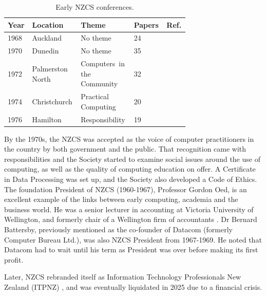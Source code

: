 \documentclass{IEEEcsmag}
\begin{document}
\begin{table}[h]
\begin{center}
\begin{tabular}{|p{0.07\linewidth}|p{0.20\linewidth}|p{0.26\linewidth}|p{0.12\linewidth}|p{0.05\linewidth}<{\raggedright\arraybackslash}|} 
 \hline
 Year & Location & Theme  & Papers & Ref.\\ 
\hline
1968 & Auckland & No theme & 24 & \cite{NZCS-1}\\\hline
1970 & Dunedin& No theme &  35 & \cite{NZCS-2}\\\hline
1972 & Palmerston North & Computers~in the Community &  32 & \cite{NZCS-3}\\\hline
1974 & Christchurch & Practical Computing &  20 & \cite{NZCS-4}\\\hline
1976 & Hamilton & Responsibility &  19 & \cite{NZCS-5}\\\hline
\end{tabular}
\vspace{1ex}
\caption{\label{NZCSconf}Early NZCS conferences.}
\end{center}
\end{table}
By the 1970s, the NZCS was accepted as the voice of computer practitioners in the country by both government and the public.  That recognition came with responsibilities and the Society started to examine social issues around the use of computing, as well as the quality of computing education on offer.  A Certificate in Data Processing was set up, and the Society also developed a Code of Ethics.
The foundation President of NZCS (1960-1967), Professor Gordon Oed,  is an excellent example of the links between early computing, academia and the business world. He was a senior lecturer in accounting at Victoria University of Wellington, and formerly chair of a Wellington firm of accountants \cite{Toland-2022}. Dr Bernard Battersby, previously mentioned as the co-founder of Datacom (formerly Computer Bureau Ltd.), was also NZCS President from 1967-1969. He noted that Datacom had to wait until his term as President was over before making its first profit.

Later, NZCS rebranded itself as Information Technology Professionals New Zealand (ITPNZ) \cite{Matthews}, and was eventually liquidated in 2025 due to a financial crisis.
\end{document}

